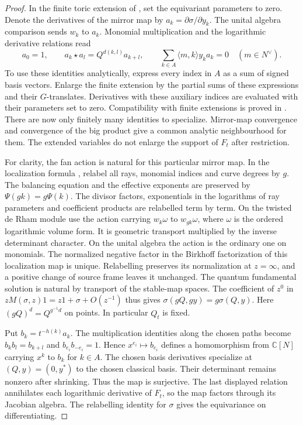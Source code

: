\documentclass[11pt]{amsart}
\theoremstyle{definition}
\newcommand{\C}{\mathbb C}
\begin{document}
\begin{proof}
In the finite toric extension of \cite[Theorems~4.28, 5.13, 7.2]{CCIT}, set the equivariant parameters to zero. Denote the derivatives of the mirror map by $a_k=\partial\sigma/\partial y_k$. The unital algebra comparison sends $w_k$ to $a_k$. Monomial multiplication and the logarithmic derivative relations read
\[
 a_0=1,\qquad a_k\star a_l=Q^{d(k,l)}a_{k+l},\qquad
 \sum_{k\in A}\langle m,k\rangle y_ka_k=0\quad(m\in N^\vee).
\]
To use these identities analytically, express every index in $A$ as a sum of signed basis vectors. Enlarge the finite extension by the partial sums of these expressions and their $G$-translates. Derivatives with these auxiliary indices are evaluated with their parameters set to zero. Compatibility with finite extensions is proved in \cite[proof of Theorem~5.13]{CCIT}. There are now only finitely many identities to specialize. Mirror-map convergence and convergence of the big product give a common analytic neighbourhood for them. The extended variables do not enlarge the support of $F_t$ after restriction.

For clarity, the fan action is natural for this particular mirror map. In the localization formula \cite[Definition~4.15, (4.11)]{CCIT}, relabel all rays, monomial indices and curve degrees by $g$. The balancing equation and the effective exponents are preserved by $\Psi(gk)=g\Psi(k)$. The divisor factors, exponentials in the logarithms of ray parameters and coefficient products are relabelled term by term. On the twisted de Rham module use the action carrying $w_k\omega$ to $w_{gk}\omega$, where $\omega$ is the ordered logarithmic volume form. It is geometric transport multiplied by the inverse determinant character. On the unital algebra the action is the ordinary one on monomials. The normalized negative factor in the Birkhoff factorization of this localization map is unique. Relabelling preserves its normalization at $z=\infty$, and a positive change of source frame leaves it unchanged. The quantum fundamental solution is natural by transport of the stable-map spaces. The coefficient of $z^0$ in $zM(\sigma,z)1=z1+\sigma+O(z^{-1})$ thus gives $\sigma(gQ,gy)=g\sigma(Q,y)$. Here $(gQ)^d=Q^{g^{-1}d}$ on points. In particular $Q_t$ is fixed.

Put $b_k=t^{-h(k)}a_k$. The multiplication identities along the chosen paths become $b_k b_l=b_{k+l}$ and $b_{e_i}b_{-e_i}=1$. Hence $x^{e_i}\mapsto b_{e_i}$ defines a homomorphism from $\C[N]$ carrying $x^k$ to $b_k$ for $k\in A$. The chosen basis derivatives specialize at $(Q,y)=(0,y^*)$ to the chosen classical basis. Their determinant remains nonzero after shrinking. Thus the map is surjective. The last displayed relation annihilates each logarithmic derivative of $F_t$, so the map factors through its Jacobian algebra. The relabelling identity for $\sigma$ gives the equivariance on differentiating.
\end{proof}
\end{document}
